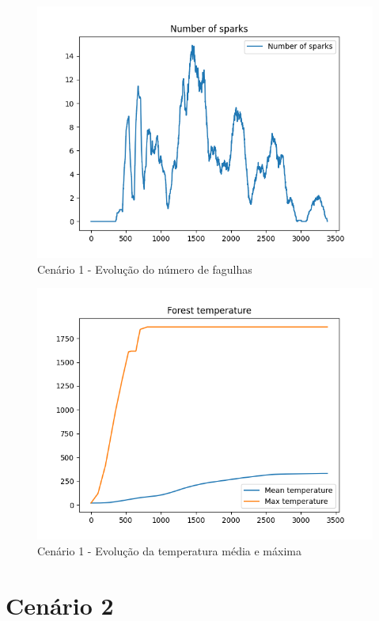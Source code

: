 \begin{figure}[H]
    \centering
    \includegraphics[width=\textwidth]{src/runs/scenario1/sparks.png}
    \caption{Cenário 1 - Evolução do número de fagulhas}
    \label{fig:S1Sparks}
\end{figure}

\begin{figure}[H]
    \centering
    \includegraphics[width=\textwidth]{src/runs/scenario1/temperature.png}
    \caption{Cenário 1 - Evolução da temperatura média e máxima}
    \label{fig:S1Temp}
\end{figure}

\section{Cenário 2}\label{sec:scenario2}

